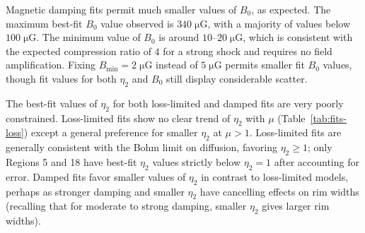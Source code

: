 \documentclass[iop, apj, numberedappendix]{emulateapj}
\newcommand*{\mt}{\mathrm}
\newcommand*{\unit}[1]{\;\mt{#1}}  %
\newcommand*{\Ecut}{E_{\mt{cut}}}
\newcommand*{\Bmin}{B_{\mt{min}}}
\newcommand*{\muG}{\unit{\mu G}}
\begin{document}
Magnetic damping fits permit much smaller values of $B_0$, as expected.
The maximum best-fit $B_0$ value observed is $340 \muG$, with a majority of
values below $100 \muG$.  The minimum value of $B_0$ is around $10$--$20 \muG$,
which is consistent with the expected compression ratio of $4$ for a strong
shock and requires no field amplification.  Fixing $\Bmin = 2 \muG$ instead of
$5 \muG$ permits smaller fit $B_0$ values, though fit values for both $\eta_2$
and $B_0$ still display considerable scatter.



The best-fit values of $\eta_2$ for both loss-limited and damped fits are very
poorly constrained.  Loss-limited fits show no clear trend of $\eta_2$ with
$\mu$ (Table~\ref{tab:fits-loss}) except a general preference for smaller
$\eta_2$ at $\mu > 1$.  Loss-limited fits are generally consistent with the
Bohm limit on diffusion, favoring $\eta_2 \geq 1$; only Regions 5 and 18 have
best-fit $\eta_2$ values strictly below $\eta_2 = 1$ after accounting for
error.  Damped fits favor smaller values of $\eta_2$ in contrast to
loss-limited models, perhaps as stronger damping and smaller $\eta_2$ have
cancelling effects on rim widths (recalling that for moderate to strong
damping, smaller $\eta_2$ gives larger rim widths).
\end{document}
